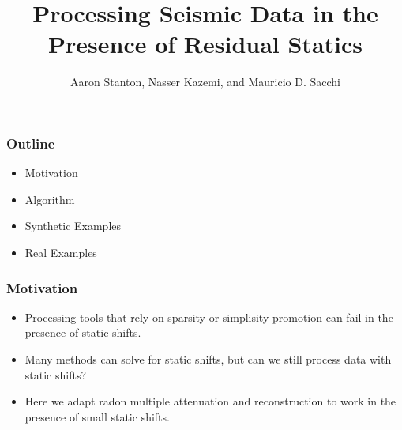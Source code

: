 \title[Short title]{Processing Seismic Data in the Presence of Residual Statics}
\author{Aaron Stanton, Nasser Kazemi, and Mauricio D. Sacchi}
\date{}


\maketitle

\begin{frame} \frametitle{Outline}
    \begin{itemize}
        \item Motivation
        \item Algorithm
        \item Synthetic Examples
        \item Real Examples
    \end{itemize}
\end{frame}

\begin{frame} \frametitle{Motivation}
    \begin{itemize}
        \item Processing tools that rely on sparsity or simplisity promotion can fail in the presence of static shifts.
	\item Many methods can solve for static shifts, but can we still process data with static shifts? 
	\item Here we adapt radon multiple attenuation and reconstruction to work in the presence of small static shifts.
    \end{itemize}
\end{frame}



